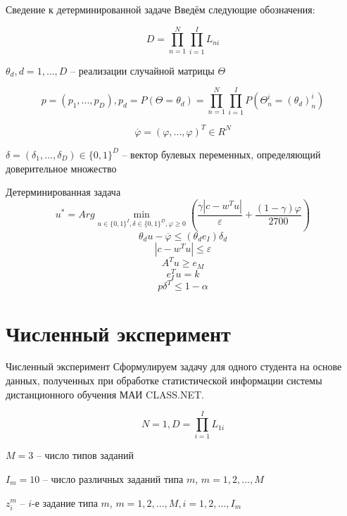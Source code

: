 \documentclass[aspectratio=169]{beamer}
\begin{document}
    \begin{frame}{Сведение к детерминированной задаче}
        Введём следующие обозначения:
        
        $$D=\prod_{n=1}^N\prod_{i=1}^I L_{ni}$$
        
        $\theta_d, d=1,...,D$ -- реализации случайной матрицы $\Theta$
        
        $$p=(p_1,...,p_D), p_d = P(\Theta=\theta_d)=\prod_{n=1}^N\prod_{i=1}^I P(\Theta_n^i=(\theta_d)_n^i)$$
        
        $$\overline{\varphi}=(\varphi,...,\varphi)^T\in R^N$$
        
        $\delta=(\delta_1,...,\delta_D)\in\{0,1\}^D$ -- вектор булевых переменных, определяющий доверительное множество
    \end{frame}
    
    \begin{frame}{Детерминированная задача}
        $$u^* = Arg\min_{u\in\{0, 1\}^I, \delta\in\{0, 1\}^D, \varphi\geq 0}\left(\frac{\gamma\left|c-w^T u\right|}{\varepsilon} + \frac{(1-\gamma)\varphi}{2700}\right)$$
        $$\theta_d u - \overline{\varphi}\leq(\theta_d e_I)\delta_d$$
        $$|c-w^T u|\leq\varepsilon$$
        $$A^T u\geq e_M$$
        $$e_I^T u=k$$
        $$p\delta^T \leq 1-\alpha$$
    \end{frame}


    \section{Численный эксперимент}
    \begin{frame}{Численный эксперимент}
        Сформулируем задачу для одного студента на основе данных, полученных при обработке статистической информации системы дистанционного обучения МАИ CLASS.NET.
        
        $$N=1, D=\prod_{i=1}^I L_{1i}$$
        
        $M=3$ -- число типов заданий
        
        $I_m=10$ -- число различных заданий типа $m$, $m=1,2,...,M$
        
        $z_i^m$ -- $i$-е задание типа $m$, $m=1,2,...,M, i=1,2,...,I_m$
    \end{frame}
\end{document}
